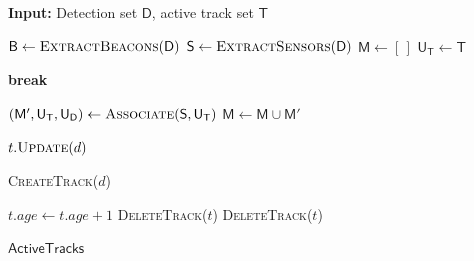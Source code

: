 
\newcommand{\added}[1]{\textcolor{blue}{#1}}

\begin{algorithm}[t]
\footnotesize
\caption{AB3DMOT + Self‐Beacon Anchoring.}
\label{alg:beacon_logic}
\begin{algorithmic}[1]        %

\Statex\textbf{Input:} Detection set $\mathsf{D}$, active track set $\mathsf{T}$

\State $\mathsf{B}      \gets \textsc{ExtractBeacons}(\mathsf{D})$
\State $\mathsf{S}      \gets \textsc{ExtractSensors}(\mathsf{D})$
\State $\mathsf{M}      \gets [\,]$                           
\State $\mathsf{U_T}    \gets \mathsf{T}$                     

            \State \textbf{break}
        \EndIf
    \EndFor
\EndFor

\State $(\mathsf{M}',\mathsf{U_T},\mathsf{U_D}) \gets
       \textsc{Associate}(\mathsf{S},\mathsf{U_T})$
\State $\mathsf{M}\!\leftarrow\!\mathsf{M}\cup\mathsf{M}'$

    \State $t.\textsc{Update}(d)$
\EndFor

        \State \textsc{CreateTrack}($d$)   
    \EndIf
\EndFor

    \State $t.\textit{age}\!\gets\!t.\textit{age}+1$
        \State \textsc{DeleteTrack}($t$)
        \State \textsc{DeleteTrack}($t$)
    \EndIf
\EndFor

\State \Return $\mathsf{ActiveTracks}$
\end{algorithmic}
\end{algorithm}